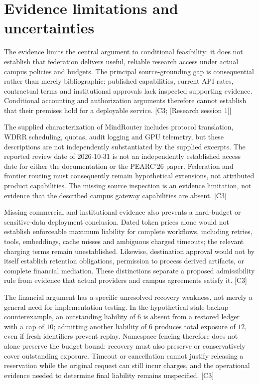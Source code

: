 \documentclass[11pt]{article}
\begin{document}
\section{Evidence limitations and uncertainties}
The evidence limits the central argument to conditional feasibility: it does not establish that federation delivers useful, reliable research access under actual campus policies and budgets. The principal source-grounding gap is consequential rather than merely bibliographic: published capabilities, current API rates, contractual terms and institutional approvals lack inspected supporting evidence. Conditional accounting and authorization arguments therefore cannot establish that their premises hold for a deployable service. [C3; [Research session 1]]

The supplied characterization of MindRouter includes protocol translation, WDRR scheduling, quotas, audit logging and GPU telemetry, but these descriptions are not independently substantiated by the supplied excerpts. The reported review date of 2026-10-31 is not an independently established access date for either the documentation or the PEARC\textquoteright{}26 paper. Federation and frontier routing must consequently remain hypothetical extensions, not attributed product capabilities. The missing source inspection is an evidence limitation, not evidence that the described campus gateway capabilities are absent. [C3]

Missing commercial and institutional evidence also prevents a hard-budget or sensitive-data deployment conclusion. Dated token prices alone would not establish enforceable maximum liability for complete workflows, including retries, tools, embeddings, cache misses and ambiguous charged timeouts; the relevant charging terms remain unestablished. Likewise, destination approval would not by itself establish retention obligations, permission to process derived artifacts, or complete financial mediation. These distinctions separate a proposed admissibility rule from evidence that actual providers and campus agreements satisfy it. [C3]

The financial argument has a specific unresolved recovery weakness, not merely a general need for implementation testing. In the hypothetical stale-backup counterexample, an outstanding liability of $6$ is absent from a restored ledger with a cap of $10$; admitting another liability of $6$ produces total exposure of $12$, even if fresh identifiers prevent replay. Namespace fencing therefore does not alone preserve the budget bound: recovery must also preserve or conservatively cover outstanding exposure. Timeout or cancellation cannot justify releasing a reservation while the original request can still incur charges, and the operational evidence needed to determine final liability remains unspecified. [C3]
\end{document}
